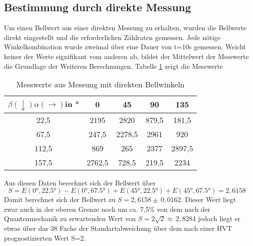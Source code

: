\documentclass[twoside,colorback,accentcolor=tud4c,11pt]{tudreport}
\begin{document}
\subsection{Bestimmung durch direkte Messung}
Um einen Bellwert aus einer direkten Messung zu erhalten, wurden die Bellwerte direkt eingestellt und die erforderlichen Zählraten gemessen. Jede nötige Winkelkombination wurde zweimal über eine Dauer von t=10s gemessen. Weicht keiner der Werte signifikant vom anderen ab, bildet der Mittelwert der Messwerte die Grundlage der Weiteren Berechnungen. Tabelle \ref{bellwerte} zeigt die Messwerte
\begin{table}[H]
\renewcommand*{\arraystretch}{1.2}
\centering
\begin{tabular}{|c|c|c|c|c|}
\hline 
$\beta(\downarrow)\alpha(\rightarrow)$in ° & 0 & 45 & 90 & 135 \\ 
\hline 
22,5 & 2195 & 2820 & 879,5 & 181,5 \\ 
\hline 
67,5 & 247,5 & 2278,5 & 2961 & 920 \\ 
\hline 
112,5 & 869 & 265 & 2377 & 2897,5 \\ 
\hline 
157,5 & 2762,5 & 728,5 & 219,5 & 2234 \\ 
\hline 
\end{tabular} 
\caption{Messwerte aus Messung mit direkten Bellwinkeln}\label{bellwerte}
\end{table}
Aus diesen Daten berechnet sich der Bellwert über 
\begin{equation}
S=E(0°,22.5°)-E(0°,67.5°)+E(45°,22.5°)+E(45°,67.5°)=2,6158
\end{equation}
Damit berechnet sich der Bellwert zu $S=2,6158\pm\,0,0162$. Dieser Wert liegt zwar auch in der oberen Grenze noch um ca. 7,5\% von dem nach der Quantenmechanik zu erwartenden Wert von $S=2\sqrt{2}\approx\,2,8284$ jedoch liegt er etwas über das 38 Fache der Standartabweichung über dem nach einer HVT prognostizierten Wert S=2.
\end{document}
